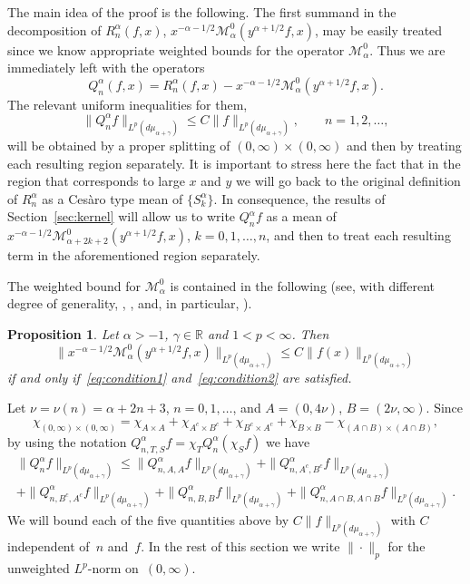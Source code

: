 \documentclass[a4paper]{amsart}
\newcommand{\calM}{\mathcal{M}}
\newcommand{\muag}{d\mu_{\alpha+\gamma}}
\newtheorem{propo}{Proposition}
\begin{document}
The main idea of the proof is the following.
The first summand in the decomposition of $R_n^\alpha(f,x)$,
$x^{-\alpha-1/2}\calM_{\alpha}^0(y^{\alpha+1/2}f,x)$,
may be easily treated since we know appropriate weighted bounds for the
operator $\calM_{\alpha}^0$. Thus we are immediately left with the
operators
\begin{equation*}
  Q_n^\alpha(f,x)
  = R_n^\alpha(f,x) - x^{-\alpha-1/2}
    \calM_{\alpha}^0(y^{\alpha+1/2}f,x).
\end{equation*}
The relevant uniform inequalities for them,
\begin{equation*}
  \|Q_n^\alpha f\|_{L^p(\muag)}
  \le C \|f\|_{L^p(\muag)},\qquad n=1,2,\dots,
\end{equation*}
will be obtained by a proper splitting of $(0,\infty)\times(0,\infty)$ and
then by treating each resulting region separately. It is important to stress
here the fact that in the region that corresponds to large $x$ and $y$ we will
go back to the original definition
of $R_n^\alpha$ as a Ces\`aro type mean of $\{S^\alpha_k\}$.
In consequence, the results of Section~\ref{sec:kernel}
will allow us to write $Q_n^\alpha f$ as a mean of
$x^{-\alpha-1/2} \calM_{\alpha+2k+2}^0(y^{\alpha+1/2}f,x)$,
$k = 0,1,\dots,n$,
and then to treat each resulting term in the aforementioned
region separately.

The weighted bound for $\calM_{\alpha}^0$ is contained in
the following (see, with different degree of generality, \cite{Her},
\cite{CiGPV-DIE}, \cite{St03} and, in particular, \cite[\S\,6.4]{CiGPV}).

\begin{propo}
\label{pro:Mab}
Let $\alpha>-1$, $\gamma\in \mathbb{R}$ and $1 < p < \infty$. Then
\begin{equation*}
  \| x^{-\alpha-1/2}\calM_{\alpha}^0(y^{\alpha+1/2}f,x)\|_{L^p(\muag)}
  \le C \| f(x) \|_{L^p(\muag)}
\end{equation*}
if and only if~\eqref{eq:condition1} and~\eqref{eq:condition2} are satisfied.
\end{propo}

Let $\nu=\nu(n)=\alpha+2n+3$, $n=0,1,\dots$, and
$A=(0,4\nu)$, $B=(2\nu,\infty)$. Since
\begin{equation*}
  \chi_{(0,\infty)\times(0,\infty)}
  = \chi_{A\times A} + \chi_{A^c\times B^c}
  + \chi_{B^c\times A^c} + \chi_{B\times B}
  - \chi_{(A\cap B)\times (A\cap B)},
\end{equation*}
by using the notation $Q^\alpha_{n,T,S}f=\chi_T Q^\alpha_n(\chi_S f)$
we have
\begin{multline*}
  \|Q^\alpha_nf\|_{L^p(\muag)}
  \le \|Q^\alpha_{n,A,A}f\|_{L^p(\muag)}
  + \|Q^\alpha_{n,A^c,B^c}f\|_{L^p(\muag)} \\
  + \|Q^\alpha_{n,B^c,A^c}f\|_{L^p(\muag)}
  + \|Q^\alpha_{n,B,B}f\|_{L^p(\muag)}
  + \|Q^\alpha_{n,A\cap B,A\cap B}f\|_{L^p(\muag)}.
\end{multline*}
We will bound each of the five quantities above by $C\|f\|_{L^p(\muag)}$
with $C$ independent of~$n$ and~$f$.
In the rest of this section we write $\|\cdot\|_p$ for the unweighted
$L^p$-norm on~$(0,\infty)$.
\end{document}

